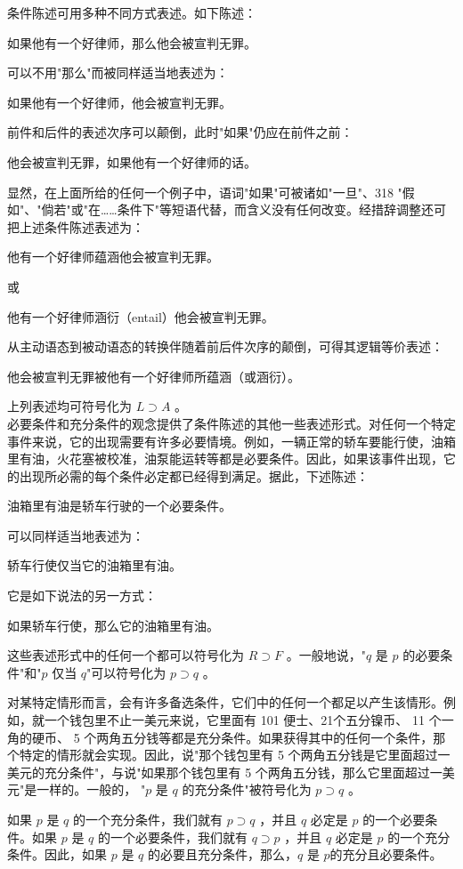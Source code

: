 条件陈述可用多种不同方式表述。如下陈述：

如果他有一个好律师，那么他会被宣判无罪。

可以不用"那么"而被同样适当地表述为：

如果他有一个好律师，他会被宣判无罪。

前件和后件的表述次序可以颠倒，此时"如果"仍应在前件之前：

他会被宣判无罪，如果他有一个好律师的话。

显然，在上面所给的任何一个例子中，语词"如果"可被诸如"一旦"、318 "假如"、"倘若"或"在……条件下"等短语代替，而含义没有任何改变。经措辞调整还可把上述条件陈述表述为：

他有一个好律师蕴涵他会被宣判无罪。

或

他有一个好律师涵衍（entail）他会被宣判无罪。

从主动语态到被动语态的转换伴随着前后件次序的颠倒，可得其逻辑等价表述：

他会被宣判无罪被他有一个好律师所蕴涵（或涵衍）。

上列表述均可符号化为 $L \supset A$ 。\\
必要条件和充分条件的观念提供了条件陈述的其他一些表述形式。对任何一个特定事件来说，它的出现需要有许多必要情境。例如，一辆正常的轿车要能行使，油箱里有油，火花塞被校准，油泵能运转等都是必要条件。因此，如果该事件出现，它的出现所必需的每个条件必定都已经得到满足。据此，下述陈述：

油箱里有油是轿车行驶的一个必要条件。

可以同样适当地表述为：

轿车行使仅当它的油箱里有油。

它是如下说法的另一方式：

如果轿车行使，那么它的油箱里有油。

这些表述形式中的任何一个都可以符号化为 $R \supset F$ 。一般地说，"$q$ 是 $p$ 的必要条件"和"$p$ 仅当 $q$"可以符号化为 $p \supset q$ 。

对某特定情形而言，会有许多备选条件，它们中的任何一个都足以产生该情形。例如，就一个钱包里不止一美元来说，它里面有 101 便士、21个五分镍币、 11 个一角的硬币、 5 个两角五分钱等都是充分条件。如果获得其中的任何一个条件，那个特定的情形就会实现。因此，说"那个钱包里有 5 个两角五分钱是它里面超过一美元的充分条件"，与说"如果那个钱包里有 5 个两角五分钱，那么它里面超过一美元"是一样的。一般的， "$p$ 是 $q$ 的充分条件"被符号化为 $p \supset q$ 。

如果 $p$ 是 $q$ 的一个充分条件，我们就有 $p \supset q$ ，并且 $q$ 必定是 $p$ 的一个必要条件。如果 $p$ 是 $q$ 的一个必要条件，我们就有 $q \supset p$ ，并且 $q$ 必定是 $p$ 的一个充分条件。因此，如果 $p$ 是 $q$ 的必要且充分条件，那么，$q$ 是 $p$的充分且必要条件。

